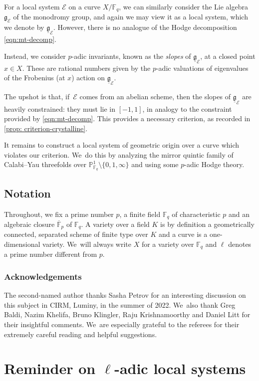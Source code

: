 \documentclass[11pt]{article}
\numberwithin{equation}{subsection}
\theoremstyle{definition}
\newcommand\Fpbar{{\overline{\mb{F}}_p}}
\let\mf\mathfrak
\let\mc\mathcal
\let\mb\mathbb
\begin{document}
For a local system $\mc{E}$ on a curve $X/\mb{F}_q$, we can similarly consider the Lie algebra~$\mf{g}_{\mc{E}}$ of the monodromy group, and again we may view it as a local system, which we denote by $\underline{\mf{g}}_{\mc{E}}$. However, there is no analogue of the Hodge decomposition \eqref{eqn:mt-decomp}.

Instead, we consider $p$-adic invariants, known as the \emph{slopes} of $\underline{\mf{g}}_{\mc{E}}$, at a closed point $x\in X$. These are rational numbers given by the $p$-adic valuations of eigenvalues of the Frobenius (at $x$) action on $\underline{\mf{g}}_{\mc{E}}$.

The upshot is that, if~$\mc{E}$ comes from an abelian scheme, then the slopes of $\underline{\mf{g}}_{\mc{E}}$ are heavily constrained: they must lie in $[-1, 1]$, in analogy to the constraint provided by \eqref{eqn:mt-decomp}. This provides a necessary criterion, as recorded in \cref{prop: criterion-crystalline}.

It remains to construct a local system of geometric origin over a curve which violates our criterion. We~do this by analyzing the mirror quintic family of Calabi--Yau threefolds over $\mb{P}^1_{\mb{F}_q}\setminus \{0,1,\infty\}$ and using some $p$-adic Hodge theory.

\subsection{Notation}
Throughout, we fix a prime number $p$, a finite field $\mathbb{F}_q$ of characteristic $p$ and an algebraic closure $\Fpbar$ of $\mathbb{F}_q$. A variety over a field $K$ is by definition a geometrically connected, separated scheme of finite type over $K$ and a curve is a one-dimensional variety. We~will always write $X$ for a variety over $\mathbb{F}_q$ and $\ell$ denotes a prime number different from $p$.

\subsubsection*{Acknowledgements}
The second-named author thanks Sasha Petrov for an interesting discussion on this subject in CIRM, Luminy, in the summer of 2022. We~also thank Greg Baldi, Nazim Khelifa, Bruno Klingler, Raju Krishnamoorthy and Daniel Litt for their insightful comments. We~are especially grateful to the referees for their extremely careful reading and helpful suggestions.

\section{Reminder on \texorpdfstring{$\ell$}{l}-adic local systems}\label{sec: coefficient}
\end{document}
